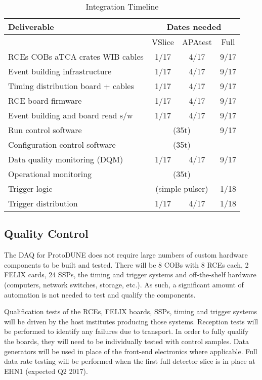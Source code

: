 \begin{table}
        \centering
\begin{tabular}{lccc}
\hline
Deliverable                        & \multicolumn{3}{c}{Dates needed}              \\
\hline
                                   & VSlice           & APAtest          & Full    \\
RCEs COBs aTCA crates WIB cables   & 1/17             & 4/17             & 9/17    \\
Event building infrastructure      & 1/17             & 4/17             & 9/17    \\
Timing distribution board + cables & 1/17             & 4/17             & 9/17    \\
RCE board firmware                 & 1/17             & 4/17             & 9/17    \\
Event building and board read s/w  & 1/17             & 4/17             & 9/17    \\
Run control software               & \multicolumn{2}{c}{(35t)}           & 9/17    \\
Configuration control software     & \multicolumn{2}{c}{(35t)}           &         \\
Data quality monitoring (DQM)      & 1/17             & 4/17             & 9/17    \\
Operational monitoring             & \multicolumn{2}{c}{(35t)}           &         \\
Trigger logic                      & \multicolumn{2}{c}{(simple pulser)} & 1/18    \\
Trigger distribution               & 1/17             & 4/17             & 1/18    \\
\hline
\end{tabular}
        \caption{Integration Timeline}
        \label{tab:daq-integration}
\end{table}



\subsection{Quality Control}

The DAQ for ProtoDUNE does not require large numbers of custom hardware components to 
be built and tested.  There will be 8 COBs with 8 RCEs each, 2 FELIX cards, 24 SSPs, the timing 
and trigger systems and off-the-shelf hardware (computers, network switches, storage, etc.).
As such, a significant amount of automation is not needed to test and qualify the 
components.  

Qualification tests of the RCEs, FELIX boards, SSPs, timing and trigger systems will
be driven by the host institutes producing those systems.  Reception tests will be 
performed to identify any failures due to transport.  In order to fully qualify the 
boards, they will need to be individually tested with control samples.  Data generators
will be used in place of the front-end electronics where applicable.  Full data rate 
testing will be performed when the first full detector slice is in place at EHN1 (expected
Q2 2017).

